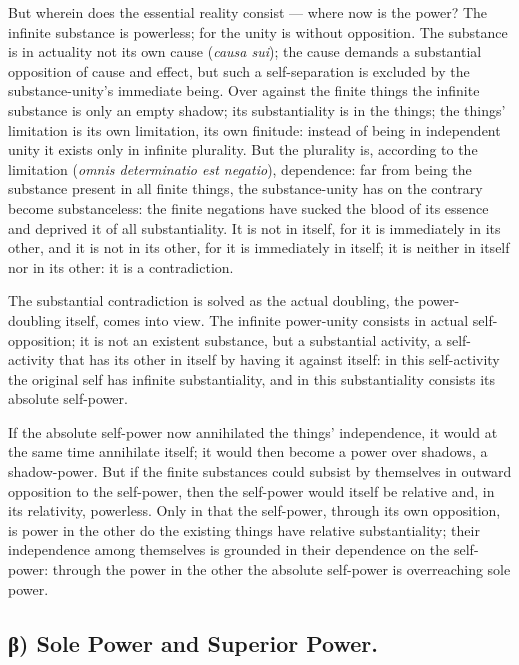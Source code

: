 \documentclass[12pt]{book}
\begin{document}
But wherein does the essential reality consist --- where now is the
power? The infinite substance is powerless; for the unity is without
opposition. The substance is in actuality not its own cause
(\textit{causa sui}); the cause demands a substantial opposition of
cause and effect, but such a self-separation is excluded by the
substance-unity's immediate being. Over against the finite things
the infinite substance is only an empty shadow; its substantiality
is in the things; the things' limitation is its own limitation, its
own finitude: instead of being in independent unity it exists only
in infinite plurality. But the plurality is, according to the
limitation (\textit{omnis determinatio est negatio}), dependence:
far from being the substance present in all finite things, the
substance-unity has on the contrary become substanceless: the finite
negations have sucked the blood of its essence and deprived it of
all substantiality. It is not in itself, for it is immediately in
its other, and it is not in its
other, for it is immediately in itself; it is neither in itself nor
in its other: it is a contradiction.

The substantial contradiction is solved as the actual doubling, the
power-doubling itself, comes into view. The infinite power-unity
consists in actual self-opposition; it is not an existent substance,
but a substantial activity, a self-activity that has its other in
itself by having it against itself: in this self-activity the
original self has infinite substantiality, and in this
substantiality consists its absolute self-power.

If the absolute self-power now annihilated the things' independence,
it would at the same time annihilate itself; it would then become a
power over shadows, a shadow-power. But if the finite substances
could subsist by themselves in outward opposition to the self-power,
then the self-power would itself be relative and, in its relativity,
powerless. Only in that the self-power, through its own opposition,
is power in the other do the existing things have relative
substantiality; their independence among themselves is grounded in
their dependence on the self-power: through the power in the other
the absolute self-power is overreaching sole power.

\subsection*{β) Sole Power and Superior Power.}
\end{document}
